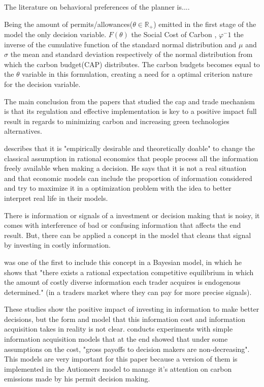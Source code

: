 \documentclass[a4paper,fleqn]{cas-dc}
\begin{document}
The literature on behavioral preferences of the planner is....



Being the amount of permits/allowances($\theta \in \mathbb{R}_+$) emitted in the first stage of the model the only decision variable. $F(\theta)$ the Social Cost of Carbon \cite{feijoo_design_2014}, $\varphi^-1$ the inverse of the cumulative function of the standard normal distribution and $\mu$ and $\sigma$ the mean and standard deviation respectively of the normal distribution from which the carbon budget(CAP) distributes. The carbon budgets becomes equal to the $\theta$ variable in this formulation, creating a need for a optimal criterion nature for the decision variable.

The main conclusion from the papers that studied the cap and trade mechanism is that its regulation and effective implementation is key to a positive impact full result in regards to minimizing carbon and increasing green technologies alternatives.  

\cite{gabaix_behavioral_2019} describes that it is "empirically desirable and theoretically doable" to change the classical assumption in rational economics that people process all the information freely available when making a decision. He says that it is not a real situation and that economic models can include the proportion of information considered and try to maximize it in a optimization problem with the idea to better interpret real life in their models. 

There is information or signals of a investment or decision making that is noisy, it comes with interference of bad or confusing  information that affects the end result. But, there can be applied a concept in the model that cleans that signal by investing in costly information.

\cite{verrecchia_information_1982} was one of the first to include this concept in a Bayesian model, in which he shows that "there exists a rational expectation competitive equilibrium in which the amount of costly diverse information each trader acquires is endogenous determined." (in a traders market where they can pay for more precise signals). 

These studies show the positive impact of investing in information to make better decisions, but the form and model that this information cost and information acquisition takes in reality is not clear. \cite{dewan_estimating_2020} conducts experiments with simple information acquisition models that at the end showed that under some assumptions on the cost, "gross payoffs to decision makers are non-decreasing". This models are very important for this paper because a version of them is implemented in the Autioneers model to manage it's attention on carbon emissions made by his permit decision making.  
\end{document}
